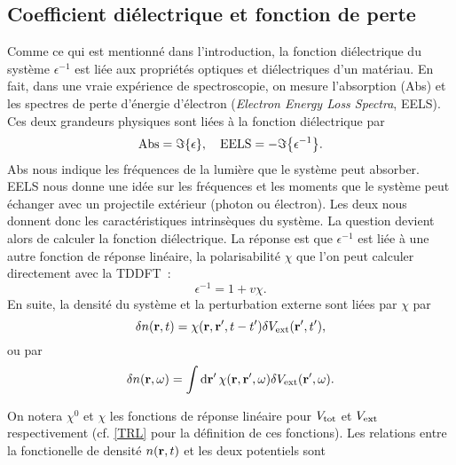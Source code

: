 \subsection{Coefficient diélectrique et fonction de perte}
\label{subsec-eels}
Comme ce qui est mentionné dans l'introduction,
la fonction diélectrique du système $\epsilon^{-1}$ est liée aux propriétés optiques et diélectriques d'un matériau.
En fait, dans une vraie expérience de spectroscopie,
on mesure l'absorption (Abs) et les spectres de perte d'énergie d'électron
(\textit{Electron Energy Loss Spectra}, EELS).
Ces deux grandeurs physiques sont liées à la fonction diélectrique par~\cite{Sottile2003}
\begin{equation}
  \label{eqn-EELS}
  \textnormal{Abs} = \imaginary\qty{\epsilon},
  \quad
  \textnormal{EELS} = -\imaginary\qty{\epsilon^{-1}}.
\end{equation}
Abs nous indique les fréquences de la lumière que le système peut absorber.
EELS nous donne une idée sur les fréquences et les moments
que le système peut échanger avec un projectile extérieur (photon ou électron).
Les deux nous donnent donc les caractéristiques intrinsèques du système.
La question devient alors de calculer la fonction diélectrique. La réponse est que
$\epsilon^{-1}$ est liée à une autre fonction de réponse linéaire,
la polarisabilité $\chi$ que l'on peut calculer directement
avec la TDDFT~\cite{Martin2004, Sottile2003}:
\begin{equation}
  \label{epsilon}
  \epsilon^{-1} = 1+ v\chi.
\end{equation}
En suite, la densité du système et la perturbation externe sont liées par $\chi$ par
\begin{equation}
  \delta n(\vb{r}, t) = \chi(\vb{r}, \vb{r}', t-t')\delta V_{\textnormal{ext}}(\vb{r}', t'),
\end{equation}
ou par
\begin{equation}
  \delta n(\vb{r}, \omega) = \int\dd{\vb{r}'}\chi(\vb{r}, \vb{r}', \omega)\delta V_{\textnormal{ext}}(\vb{r}', \omega).
\end{equation}

On notera $\chi^0$ et $\chi$ les fonctions de réponse linéaire pour
$V_{\textnormal{tot}}$ et $V_{\textnormal{ext}}$ respectivement (cf. \cref{TRL} pour la définition de ces fonctions).
Les relations entre la fonctionelle de densité $n(\vb{r}, t)$ et les deux potentiels sont

